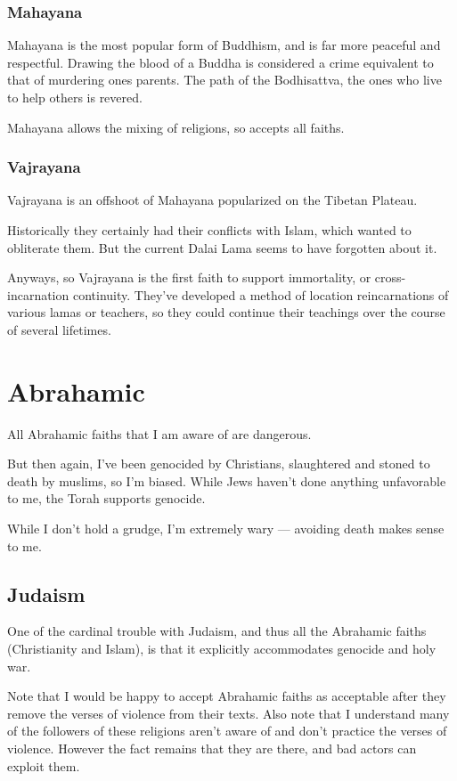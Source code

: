 \subsection{Mahayana}
Mahayana is the most popular form of Buddhism, and is far more peaceful and
respectful. Drawing the blood of a Buddha is considered a crime equivalent to
that of murdering ones parents.  The path of the Bodhisattva, the ones who live 
to help others is revered.  

Mahayana allows the mixing of religions, so accepts all faiths. 

\subsection{Vajrayana}
Vajrayana is an offshoot of Mahayana popularized on the Tibetan Plateau. 

Historically they certainly had their conflicts with Islam, which wanted to
obliterate them.  But the current Dalai Lama seems to have forgotten about it. 

Anyways, so Vajrayana is the first faith to support immortality,  or
cross-incarnation continuity.  They've developed a method of location
reincarnations of various lamas or teachers, so they could continue their
teachings over the course of several lifetimes. 

\chapter{Abrahamic}
All Abrahamic faiths that I am aware of are dangerous.

But then again, I've been genocided by Christians, slaughtered and 
stoned to death by muslims, so I'm biased. While Jews haven't done anything
unfavorable to me, the Torah supports genocide.

While I don't hold a grudge, I'm extremely wary --- avoiding death makes sense to
me. 

\section{Judaism}
One of the cardinal trouble with Judaism, and thus all the Abrahamic faiths
(Christianity and Islam), is that
it explicitly accommodates genocide and holy war. 

Note that I would be happy to accept Abrahamic faiths as acceptable after they
remove the verses of violence from their texts. Also note that I understand many
of the followers of these religions aren't aware of and don't practice the
verses of violence.  However the fact remains that they are there, and bad
actors can exploit them.

